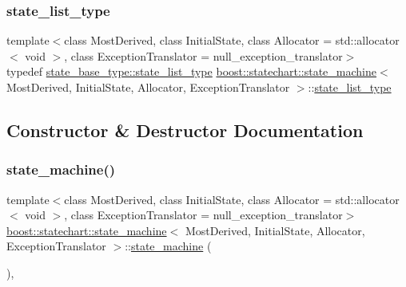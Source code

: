 \subsubsection{\texorpdfstring{state\+\_\+list\+\_\+type}{state\_list\_type}}
{\footnotesize\ttfamily template$<$class Most\+Derived, class Initial\+State, class Allocator = std\+::allocator$<$ void $>$, class Exception\+Translator = null\+\_\+exception\+\_\+translator$>$ \\
typedef \mbox{\hyperlink{classboost_1_1statechart_1_1detail_1_1state__base_a30bb6c4893e4cd84e80133feb2cc8230}{state\+\_\+base\+\_\+type\+::state\+\_\+list\+\_\+type}} \mbox{\hyperlink{classboost_1_1statechart_1_1state__machine}{boost\+::statechart\+::state\+\_\+machine}}$<$ Most\+Derived, Initial\+State, Allocator, Exception\+Translator $>$\+::\mbox{\hyperlink{classboost_1_1statechart_1_1state__machine_afe501a67ddcd1da38728f6c672b57198}{state\+\_\+list\+\_\+type}}}



\subsection{Constructor \& Destructor Documentation}
\mbox{\label{classboost_1_1statechart_1_1state__machine_add3649c5baab6017a094ae563d6075b6}} 
\subsubsection{\texorpdfstring{state\+\_\+machine()}{state\_machine()}}
{\footnotesize\ttfamily template$<$class Most\+Derived, class Initial\+State, class Allocator = std\+::allocator$<$ void $>$, class Exception\+Translator = null\+\_\+exception\+\_\+translator$>$ \\
\mbox{\hyperlink{classboost_1_1statechart_1_1state__machine}{boost\+::statechart\+::state\+\_\+machine}}$<$ Most\+Derived, Initial\+State, Allocator, Exception\+Translator $>$\+::\mbox{\hyperlink{classboost_1_1statechart_1_1state__machine}{state\+\_\+machine}} (\begin{DoxyParamCaption}{ }\end{DoxyParamCaption})\hspace{0.3cm}{\ttfamily [inline]}, {\ttfamily [protected]}}


